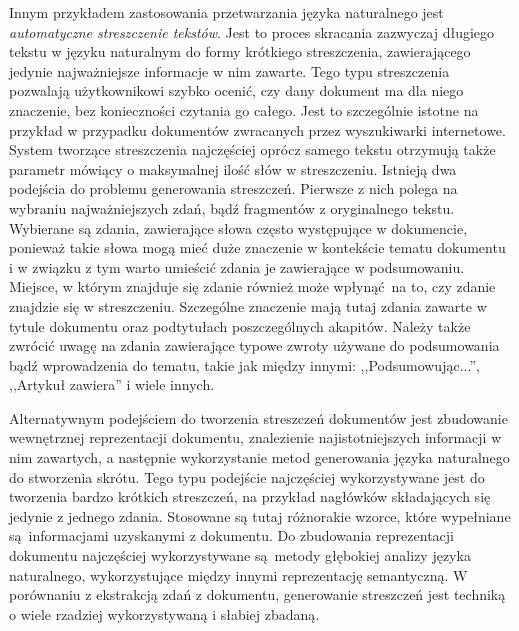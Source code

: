 \documentclass[a4paper, twoside, 12pt]{report}
\begin{document}
            Innym przykładem zastosowania przetwarzania języka naturalnego jest \emph{automatyczne streszczenie tekstów}.
            Jest to proces skracania zazwyczaj długiego tekstu w języku naturalnym do formy krótkiego streszczenia,
            zawierającego jedynie najważniejsze informacje w nim zawarte. Tego typu streszczenia pozwalają
            użytkownikowi szybko ocenić, czy dany dokument ma dla niego znaczenie, bez konieczności czytania go całego.
            Jest to szczególnie istotne na przykład w przypadku dokumentów zwracanych przez wyszukiwarki internetowe.
            System tworzące streszczenia najczęściej oprócz samego tekstu otrzymują także parametr
            mówiący o maksymalnej ilość słów w streszczeniu. Istnieją dwa podejścia do problemu generowania streszczeń.
            Pierwsze z nich polega na wybraniu najważniejszych zdań, bądź fragmentów z oryginalnego tekstu. Wybierane
            są zdania, zawierające słowa często występujące w dokumencie, ponieważ takie słowa mogą mieć duże znaczenie
            w kontekście tematu dokumentu i w związku z tym warto umieścić zdania je zawierające w podsumowaniu. Miejsce,
            w którym znajduje się zdanie również może wpłynąć na to, czy zdanie znajdzie się w streszczeniu. Szczególne
            znaczenie mają tutaj zdania zawarte w tytule dokumentu oraz podtytułach poszczególnych akapitów. Należy
            także zwrócić uwagę na zdania zawierające typowe zwroty używane do podsumowania bądź wprowadzenia do tematu,
            takie jak między innymi: ,,Podsumowując...'', ,,Artykuł zawiera'' i wiele innych.

            Alternatywnym podejściem do tworzenia streszczeń dokumentów jest zbudowanie wewnętrznej reprezentacji
            dokumentu, znalezienie najistotniejszych informacji w nim zawartych, a następnie wykorzystanie metod
            generowania języka naturalnego do stworzenia skrótu. Tego typu podejście najczęściej wykorzystywane jest
            do tworzenia bardzo krótkich streszczeń, na przykład nagłówków składających się jedynie z jednego zdania.
            Stosowane są tutaj różnorakie wzorce, które wypełniane są informacjami uzyskanymi z dokumentu. Do zbudowania
            reprezentacji dokumentu najczęściej wykorzystywane są metody głębokiej analizy języka naturalnego,
            wykorzystujące między innymi reprezentację semantyczną. W porównaniu z ekstrakcją zdań z dokumentu, generowanie
            streszczeń jest techniką o wiele rzadziej wykorzystywaną i słabiej zbadaną\cite{SUMMARIZATIONOVERVIEW}.
\end{document}
